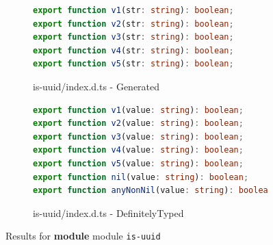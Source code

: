 \documentclass[sigconf]{acmart}
\begin{document}



\begin{figure}[tp]
  \centering
  \begin{subfigure}{0.48\linewidth}
    \begin{lstlisting}[language=TypeScript,numbers=none]
export function v1(str: string): boolean;
export function v2(str: string): boolean;
export function v3(str: string): boolean;
export function v4(str: string): boolean;
export function v5(str: string): boolean;
    \end{lstlisting}
    \caption{is-uuid/index.d.ts - Generated}
  \end{subfigure}
  \hfill
  \begin{subfigure}{0.48\linewidth}
    \begin{lstlisting}[language=TypeScript,numbers=none]
export function v1(value: string): boolean;
export function v2(value: string): boolean;
export function v3(value: string): boolean;
export function v4(value: string): boolean;
export function v5(value: string): boolean;
export function nil(value: string): boolean;
export function anyNonNil(value: string): boolean;
    \end{lstlisting}
    \caption{is-uuid/index.d.ts - DefinitelyTyped}
  \end{subfigure}

  \caption{Results for \textbf{module}  module \texttt{is-uuid}}
  \label{fig:experiments-results-module-is-uuid}
\end{figure}
\end{document}

